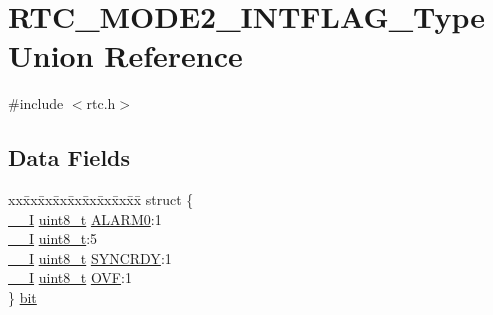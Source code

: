 \hypertarget{union_r_t_c___m_o_d_e2___i_n_t_f_l_a_g___type}{}\section{R\+T\+C\+\_\+\+M\+O\+D\+E2\+\_\+\+I\+N\+T\+F\+L\+A\+G\+\_\+\+Type Union Reference}
\label{union_r_t_c___m_o_d_e2___i_n_t_f_l_a_g___type}


{\ttfamily \#include $<$rtc.\+h$>$}

\subsection*{Data Fields}
\begin{DoxyCompactItemize}
\item 
\begin{tabbing}
xx\=xx\=xx\=xx\=xx\=xx\=xx\=xx\=xx\=\kill
struct \{\\
\>\mbox{\hyperlink{core__cm0plus_8h_af63697ed9952cc71e1225efe205f6cd3}{\_\_I}} \mbox{\hyperlink{union_r_t_c___m_o_d_e2___i_n_t_f_l_a_g___type_a5b4208c6f4c4a4290c4f2804d1eb1d5b}{uint8\_t}} \mbox{\hyperlink{union_r_t_c___m_o_d_e2___i_n_t_f_l_a_g___type_a0ba63b92c7e4bd603a2ac457479778cd}{ALARM0}}:1\\
\>\mbox{\hyperlink{core__cm0plus_8h_af63697ed9952cc71e1225efe205f6cd3}{\_\_I}} \mbox{\hyperlink{union_r_t_c___m_o_d_e2___i_n_t_f_l_a_g___type_a5b4208c6f4c4a4290c4f2804d1eb1d5b}{uint8\_t}}:5\\
\>\mbox{\hyperlink{core__cm0plus_8h_af63697ed9952cc71e1225efe205f6cd3}{\_\_I}} \mbox{\hyperlink{union_r_t_c___m_o_d_e2___i_n_t_f_l_a_g___type_a5b4208c6f4c4a4290c4f2804d1eb1d5b}{uint8\_t}} \mbox{\hyperlink{union_r_t_c___m_o_d_e2___i_n_t_f_l_a_g___type_ae8a10cfa0bb63130ae1e8150943d680b}{SYNCRDY}}:1\\
\>\mbox{\hyperlink{core__cm0plus_8h_af63697ed9952cc71e1225efe205f6cd3}{\_\_I}} \mbox{\hyperlink{union_r_t_c___m_o_d_e2___i_n_t_f_l_a_g___type_a5b4208c6f4c4a4290c4f2804d1eb1d5b}{uint8\_t}} \mbox{\hyperlink{union_r_t_c___m_o_d_e2___i_n_t_f_l_a_g___type_a52c588fc013d003e33ea581b20d4ba73}{OVF}}:1\\
\} \mbox{\hyperlink{union_r_t_c___m_o_d_e2___i_n_t_f_l_a_g___type_a99b9be019ce440c5c35b8a0167c158bf}{bit}}\\


\end{tabbing}
\end{DoxyCompactItemize}
